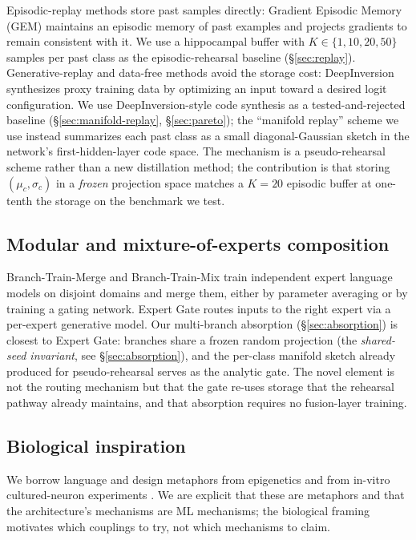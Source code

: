 \documentclass[11pt]{article}
\begin{document}
Episodic-replay methods store past samples directly: Gradient
Episodic Memory (GEM) \citep{lopezpaz2017gem} maintains an episodic
memory of past examples
and projects gradients to remain consistent with it. We use a hippocampal
buffer with $K \in \{1, 10, 20, 50\}$ samples per past class as the
episodic-rehearsal baseline (\S\ref{sec:replay}). Generative-replay and
data-free methods avoid the storage cost: DeepInversion
\citep{yin2020deepinversion} synthesizes proxy training data by
optimizing an input toward a desired logit configuration. We use
DeepInversion-style code synthesis as a tested-and-rejected baseline
(\S\ref{sec:manifold-replay}, \S\ref{sec:pareto}); the ``manifold
replay'' scheme we use instead summarizes each past class as a small
diagonal-Gaussian sketch in the network's first-hidden-layer code space.
The mechanism is a pseudo-rehearsal scheme rather than a new
distillation method; the contribution is that storing $(\mu_c,
\sigma_c)$ in a \emph{frozen} projection space matches a $K = 20$
episodic buffer at one-tenth the storage on the benchmark we test.

\subsection{Modular and mixture-of-experts composition}
\label{sec:rel-modular}

Branch-Train-Merge \citep{li2022btm} and Branch-Train-Mix
\citep{sukhbaatar2024btx} train independent expert language models on
disjoint domains and merge them, either by parameter averaging or by
training a gating network. Expert Gate \citep{aljundi2017expert} routes
inputs to the right expert via a per-expert generative model. Our
multi-branch absorption (\S\ref{sec:absorption}) is closest to Expert
Gate: branches share a frozen random projection (the \emph{shared-seed
invariant}, see \S\ref{sec:absorption}), and the per-class manifold
sketch already produced for pseudo-rehearsal serves as the analytic
gate. The novel element is not the routing mechanism but that the gate
re-uses storage that the rehearsal pathway already maintains, and that
absorption requires no fusion-layer training.

\subsection{Biological inspiration}
\label{sec:rel-bio}

We borrow language and design metaphors from epigenetics
\citep{wolpert1969positional, smith2013dna, bannister2011histone,
allis2016hallmarks, bartel2009micrornas, schratt2009micrornas,
tononi2014sleep} and from in-vitro cultured-neuron experiments
\citep{kagan2022dishbrain}. We are explicit that these are metaphors
and that the architecture's mechanisms are ML mechanisms; the
biological framing motivates which couplings to try, not which
mechanisms to claim.
\end{document}
